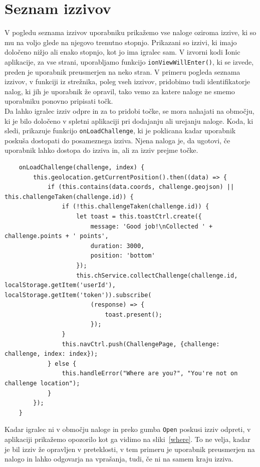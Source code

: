 \documentclass[a4paper, 12pt]{book}
\begin{document}
\section{Seznam izzivov}
V pogledu seznama izzivov uporabniku prikažemo vse naloge oziroma izzive, ki so mu na voljo glede na njegovo trenutno stopnjo. Prikazani so izzivi, ki imajo določeno nižjo ali enako stopnjo, kot jo ima igralec sam. V izvorni kodi Ionic aplikacije, za vse strani, uporabljamo funkcijo \texttt{ionViewWillEnter()}, ki se izvede, preden je uporabnik preusmerjen na neko stran. V primeru pogleda seznama izzivov, v funkciji iz strežnika, poleg vseh izzivov, pridobimo tudi identifikatorje nalog, ki jih je uporabnik že opravil, tako vemo za katere naloge ne smemo uporabniku ponovno pripisati točk.\\
Da lahko igralec izziv odpre in za to pridobi točke, se mora nahajati na območju, ki je bilo določeno v spletni aplikaciji pri dodajanju ali urejanju naloge. Koda, ki sledi, prikazuje funkcijo \texttt{onLoadChallenge}, ki je poklicana kadar uporabnik poskuša dostopati do posameznega izziva. Njena naloga je, da ugotovi, če uporabnik lahko dostopa do izziva in, ali za izziv prejme točke.
\begin{lstlisting}
    onLoadChallenge(challenge, index) {
        this.geolocation.getCurrentPosition().then((data) => {
            if (this.contains(data.coords, challenge.geojson) || this.challengeTaken(challenge.id)) {
                if (!this.challengeTaken(challenge.id)) {
                    let toast = this.toastCtrl.create({
                        message: 'Good job!\nCollected ' + challenge.points + ' points',
                        duration: 3000,
                        position: 'bottom'
                    });
                    this.chService.collectChallenge(challenge.id, localStorage.getItem('userId'), localStorage.getItem('token')).subscribe(
                        (response) => {
                            toast.present();
                        });
                }
                this.navCtrl.push(ChallengePage, {challenge: challenge, index: index});
            } else {
                this.handleError("Where are you?", "You're not on challenge location");
            }
        });
    }
\end{lstlisting}
\noindent Kadar igralec ni v območju naloge in preko gumba \texttt{Open} poskusi izziv odpreti, v aplikaciji prikažemo opozorilo kot ga vidimo na sliki~\ref{where}. To ne velja, kadar je bil izziv že opravljen v preteklosti, v tem primeru je uporabnik preusmerjen na nalogo in lahko odgovarja na vprašanja, tudi, če ni na samem kraju izziva. 
\end{document}
